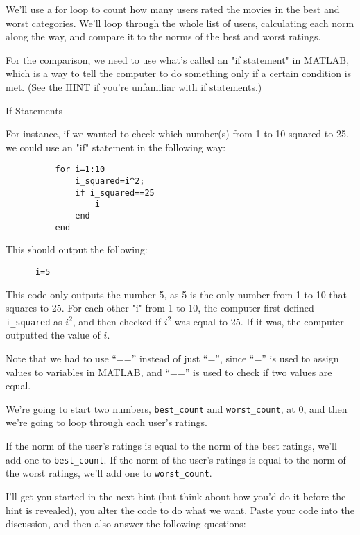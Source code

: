 \documentclass{ximera}
\begin{document}
\begin{exploration}
    We'll use a for loop to count how many users rated the movies in the best and worst categories. We'll loop through the whole list of users, calculating each norm along the way, and compare it to the norms of the best and worst ratings. 
    
    For the comparison, we need to use what's called an "if statement" in MATLAB, which is a way to tell the computer to do something only if a certain condition is met. (See the HINT if you're unfamiliar with if statements.)

    \begin{remark}{If Statements}

      For instance, if we wanted to check which number(s) from 1 to 10 squared to 25, we could use an "if" statement in the following way:

    \begin{verbatim}
          for i=1:10
              i_squared=i^2;
              if i_squared==25
                  i
              end
          end
    \end{verbatim}


   This should output the following:

  \begin{verbatim}
      i=5
  \end{verbatim}

      This code only outputs the number 5, as 5 is the only number from 1 to 10 that squares to 25. For each other "i" from 1 to 10, the computer first defined \texttt{i\_squared} as $i^2$, and then checked if $i^2$ was equal to 25. If it was, the computer outputted the value of $i$.

      Note that we had to use ``=='' instead of just ``='', since ``='' is used to assign values to variables in MATLAB, and ``=='' is used to check if two values are equal.

  \end{remark}
    
    We're going to start two numbers, \texttt{best\_count} and \texttt{worst\_count}, at 0, and then we're going to loop through each user's ratings. 
    
    If the norm of the user's ratings is equal to the norm of the best ratings, we'll add one to \texttt{best\_count}. If the norm of the user's ratings is equal to the norm of the worst ratings, we'll add one to \texttt{worst\_count}.

    I'll get you started in the next hint (but think about how you'd do it before the hint is revealed), you alter the code to do what we want. Paste your code into the discussion, and then also answer the following questions:


\end{exploration}
\end{document}
